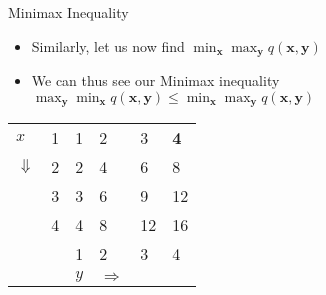 \documentclass[xcolor=table]{beamer}
\begin{document}
            \begin{frame}{Minimax Inequality}
                \begin{itemize}[<+->]
                    \item Similarly, let us now find $\min_{\boldsymbol{x}}\max _{\boldsymbol{y}} q(\boldsymbol{x}, \boldsymbol{y})$
                    \item We can thus see our Minimax inequality $\max _{\boldsymbol{y}} \min _{\boldsymbol{x}} q(\boldsymbol{x}, \boldsymbol{y}) \leqslant \min _{\boldsymbol{x}} \max _{\boldsymbol{y}} q(\boldsymbol{x}, \boldsymbol{y})$
                \end{itemize}

                \begin{table}[]
                    \begin{tabular}{llllll}
                    \cline{2-2}
                    \multicolumn{1}{l|}{$x$}          & \multicolumn{1}{l|}{1} & 1                      & 2                      & 3                      & \cellcolor[HTML]{6665CD}\textbf{4} \\ \cline{2-2}
                    \multicolumn{1}{l|}{$\Downarrow$} & \multicolumn{1}{l|}{2} & 2                      & 4                      & 6                      & \cellcolor[HTML]{CBCEFB}8          \\ \cline{2-2}
                    \multicolumn{1}{l|}{}             & \multicolumn{1}{l|}{3} & 3                      & 6                      & 9                      & \cellcolor[HTML]{CBCEFB}12         \\ \cline{2-2}
                    \multicolumn{1}{l|}{}             & \multicolumn{1}{l|}{4} & 4                      & 8                      & 12                     & \cellcolor[HTML]{CBCEFB}16         \\ \cline{2-6} 
                    \multicolumn{1}{l|}{}             & \multicolumn{1}{l|}{}  & \multicolumn{1}{l|}{1} & \multicolumn{1}{l|}{2} & \multicolumn{1}{l|}{3} & \multicolumn{1}{l|}{4}             \\ \cline{2-6} 
                                                      &                        & $y$                    & $\Rightarrow$          &                        &                                   
                    \end{tabular}
                    \end{table}
            \end{frame}
\end{document}
